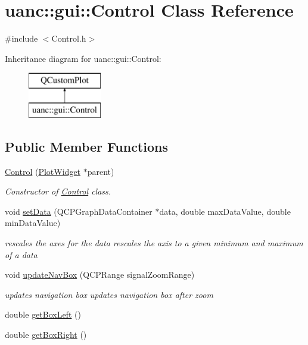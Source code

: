 \hypertarget{classuanc_1_1gui_1_1_control}{}\section{uanc\+:\+:gui\+:\+:Control Class Reference}
\label{classuanc_1_1gui_1_1_control}


{\ttfamily \#include $<$Control.\+h$>$}

Inheritance diagram for uanc\+:\+:gui\+:\+:Control\+:\begin{figure}[H]
\begin{center}
\leavevmode
\includegraphics[height=2.000000cm]{classuanc_1_1gui_1_1_control}
\end{center}
\end{figure}
\subsection*{Public Member Functions}
\begin{DoxyCompactItemize}
\item 
\hyperlink{classuanc_1_1gui_1_1_control_a4ad4c4c3eafb8b794dc532f7c92834ec}{Control} (\hyperlink{classuanc_1_1gui_1_1_plot_widget}{Plot\+Widget} $\ast$parent)
\begin{DoxyCompactList}\small\item\em Constructor of \hyperlink{classuanc_1_1gui_1_1_control}{Control} class. \end{DoxyCompactList}\item 
void \hyperlink{classuanc_1_1gui_1_1_control_af4b37736f5e75f13bea8579affeb960c}{set\+Data} (Q\+C\+P\+Graph\+Data\+Container $\ast$data, double max\+Data\+Value, double min\+Data\+Value)
\begin{DoxyCompactList}\small\item\em rescales the axes for the data rescales the axis to a given minimum and maximum of a data \end{DoxyCompactList}\item 
void \hyperlink{classuanc_1_1gui_1_1_control_a621e6bef8d7ade46bbf81e36690618af}{update\+Nav\+Box} (Q\+C\+P\+Range signal\+Zoom\+Range)
\begin{DoxyCompactList}\small\item\em updates navigation box updates navigation box after zoom \end{DoxyCompactList}\item 
double \hyperlink{classuanc_1_1gui_1_1_control_a219dd654ffa8fb96944defe6cf167401}{get\+Box\+Left} ()
\item 
double \hyperlink{classuanc_1_1gui_1_1_control_a4ccfd10312d76eea24f7991632692b59}{get\+Box\+Right} ()
\end{DoxyCompactItemize}


